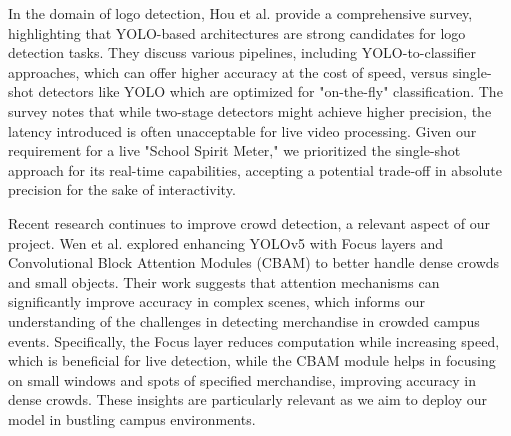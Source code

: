 In the domain of logo detection, Hou et al. \cite{hou2022deep} provide a comprehensive survey, highlighting that YOLO-based architectures are strong candidates for logo detection tasks. They discuss various pipelines, including YOLO-to-classifier approaches, which can offer higher accuracy at the cost of speed, versus single-shot detectors like YOLO which are optimized for "on-the-fly" classification. The survey notes that while two-stage detectors might achieve higher precision, the latency introduced is often unacceptable for live video processing. Given our requirement for a live "School Spirit Meter," we prioritized the single-shot approach for its real-time capabilities, accepting a potential trade-off in absolute precision for the sake of interactivity.

Recent research continues to improve crowd detection, a relevant aspect of our project. Wen et al. \cite{wen2024research} explored enhancing YOLOv5 with Focus layers and Convolutional Block Attention Modules (CBAM) to better handle dense crowds and small objects. Their work suggests that attention mechanisms can significantly improve accuracy in complex scenes, which informs our understanding of the challenges in detecting merchandise in crowded campus events. Specifically, the Focus layer reduces computation while increasing speed, which is beneficial for live detection, while the CBAM module helps in focusing on small windows and spots of specified merchandise, improving accuracy in dense crowds. These insights are particularly relevant as we aim to deploy our model in bustling campus environments.


